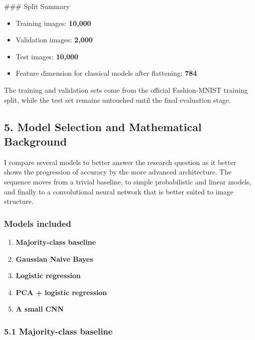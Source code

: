 \documentclass[11pt]{article}
\providecommand{\tightlist}{%
      \setlength{\itemsep}{0pt}\setlength{\parskip}{0pt}}
\begin{document}
    \#\#\# Split Summary

\begin{itemize}
\tightlist
\item
  Training images: \textbf{10,000}
\item
  Validation images: \textbf{2,000}
\item
  Test images: \textbf{10,000}
\item
  Feature dimension for classical models after flattening: \textbf{784}
\end{itemize}

The training and validation sets come from the official Fashion-MNIST
training split, while the test set remains untouched until the final
evaluation stage.

    \subsection{5. Model Selection and Mathematical
Background}\label{model-selection-and-mathematical-background}

I compare several models to better answer the research question as it
better shows the progression of accuracy by the more advanced
architecture. The sequence moves from a trivial baseline, to simple
probabilistic and linear models, and finally to a convolutional neural
network that is better suited to image structure.

\subsubsection{Models included}\label{models-included}

\begin{enumerate}
\def\labelenumi{\arabic{enumi}.}
\tightlist
\item
  \textbf{Majority-class baseline}\\
\item
  \textbf{Gaussian Naive Bayes}\\
\item
  \textbf{Logistic regression}\\
\item
  \textbf{PCA + logistic regression}\\
\item
  \textbf{A small CNN}
\end{enumerate}

\subsubsection{5.1 Majority-class
baseline}\label{majority-class-baseline}
\end{document}
